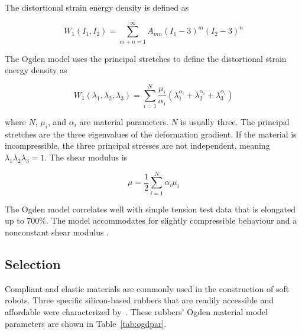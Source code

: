 The distortional strain energy density is defined as \citep{Kim2015}

\begin{equation}
	W_{1}\left ( I_{1},I_{2} \right )=\sum_{m+n=1}^{\infty}A_{mn}\left ( I_{1}-3 \right )^{m}\left ( I_{2}-3 \right )^{n}
\end{equation}

The Ogden model uses the principal stretches to define the distortional strain energy density as \citep{Ogden1972}

\begin{equation}
	\label{eq:om}
	W_{1}\left ( \lambda_{1},  \lambda_{2}, \lambda_{3} \right )=\sum_{i=1}^{N}\frac{\mu_{i}}{\alpha_{i}}\left ( \lambda_{1}^{\alpha_{i}} + \lambda_{2}^{\alpha_{i}} + \lambda_{3}^{\alpha_{i}} \right )
\end{equation}

where $N$, $\mu_{i}$, and $\alpha_{i}$ are material parameters. $N$ is usually three. The principal stretches are the three eigenvalues of the deformation gradient. If the material is incompressible, the three principal stresses are not independent, meaning $\lambda_{1}\lambda_{2}\lambda_{3}=1$. The shear modulus is \citep{Ogden1972}

\begin{equation}
	\mu=\frac{1}{2}\sum_{i=1}^{N}\alpha_{i}\mu_{i}
\end{equation}

The Ogden model correlates well with simple tension test data that is elongated up to 700\%. The model accommodates for slightly compressible behaviour and a nonconstant shear modulus \citep{Ogden1972, Kim2015}.

\subsection{Selection}

Compliant and elastic materials are commonly used in the construction of soft robots. Three specific silicon-based rubbers that are readily accessible and affordable were characterized by~\cite{Ellis2020}. These rubbers' Ogden material model parameters are shown in Table~\ref{tab:ogdpar}.

